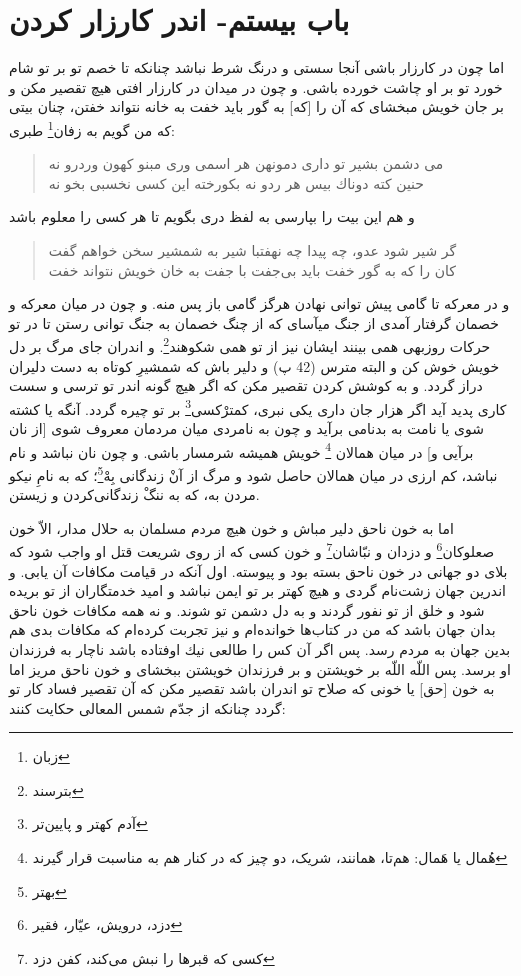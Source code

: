 \section*{باب بيستم-
اندر كارزار كردن}

اما چون در كارزار باشى آنجا سستى و درنگ شرط نباشد چنانكه تا خصم تو بر تو شام خورد تو بر او چاشت خورده باشى. و چون در ميدان در كارزار افتى هيچ تقصير مكن و بر جان خويش مبخشاى كه آن را [كه] به گور بايد خفت به خانه نتواند خفتن، چنان بيتى كه من گويم به زفان\footnote{زبان} طبرى:

\begin{quote}
\centering
مى دشمن بشير تو دارى دمونهن \quad \quad هر اسمى ورى مبنو كهون وردرو نه \\
حنين كته دوناك بيس هر ردو نه \quad \quad بكورخته اين كسى نخسبى بخو نه

\end{quote}
و هم اين بيت را بپارسى به لفظ درى بگويم تا هر كسى را معلوم باشد

\begin{quote}
\centering
گر شير شود عدو، چه پيدا چه نهفت\quad \quad با شير به شمشير سخن خواهم گفت \\
كان را كه به گور خفت بايد بى‌جفت \quad \quad با جفت به خان خويش نتواند خفت
\end{quote}
و در معركه تا گامى پيش توانى نهادن هرگز گامى باز پس منه. و چون در ميان معركه و خصمان گرفتار آمدى از جنگ ميآساى كه از چنگ خصمان به جنگ توانى رستن تا در تو حركات روزبهى همى‌ بينند ايشان نيز از تو همى شكوهند\footnote{بترسند}. و اندران جاى مرگ بر دل خويش خوش كن و البته مترس (42 پ) و دلير باش كه شمشيرِ كوتاه به دست دليران دراز گردد. و به كوشش كردن تقصير مكن كه اگر هيچ گونه اندر تو ترسى و سست كارى پديد آيد اگر هزار جان دارى يكى نبرى، كمترْكسى\footnote{آدم کهتر و پایین‌تر} بر تو چيره گردد. آنگه يا كشته شوى يا نامت به بدنامى برآيد و چون به نامردى ميان مردمان معروف شوى [از نان برآيى و] در ميان همالان \footnote{هُمال یا هَمال: هم‌تا، همانند، شریک، دو چیز که در کنار هم به مناسبت قرار گیرند} خويش هميشه شرمسار باشى. و چون نان نباشد و نام نباشد، كم ارزى در ميان همالان حاصل شود و مرگ از آنْ زندگانى بِهْ\footnote{بهتر}؛ كه به نامِ نيكو مردن به، كه به ننگْ زندگانى‌كردن و زيستن.

اما به خون ناحق دلير مباش و خون هيچ مردم مسلمان به حلال مدار، الاّ خون صعلوكان\footnote{دزد، درویش، عیّار، فقیر} و دزدان و نبّاشان\footnote{کسی که قبرها را نبش می‌کند، کفن دزد} و خون كسى كه از روى شريعت قتل او واجب شود كه بلاى دو جهانى در خون ناحق بسته بود و پيوسته. اول آنكه در قيامت مكافات آن يابى. و اندرين جهان زشت‌نام گردى و هيچ كهتر بر تو ايمن نباشد و اميد خدمتگاران از تو بريده شود و خلق از تو نفور گردند و به دل دشمن تو شوند. و نه همه مكافات خون ناحق بدان جهان باشد كه من در كتاب‌ها خوانده‌ام و نيز تجربت كرده‌ام كه مكافات بدى هم بدين جهان به مردم رسد. پس اگر آن كس را طالعى نيك اوفتاده باشد ناچار به فرزندان او برسد. پس اللّه اللّه بر خويشتن و بر فرزندان خويشتن ببخشاى و خون ناحق مريز اما به خون [حق] يا خونى كه صلاح تو اندران باشد تقصير مكن كه آن تقصير فساد كار تو گردد چنانكه از جدّم شمس المعالى حكايت كنند:

